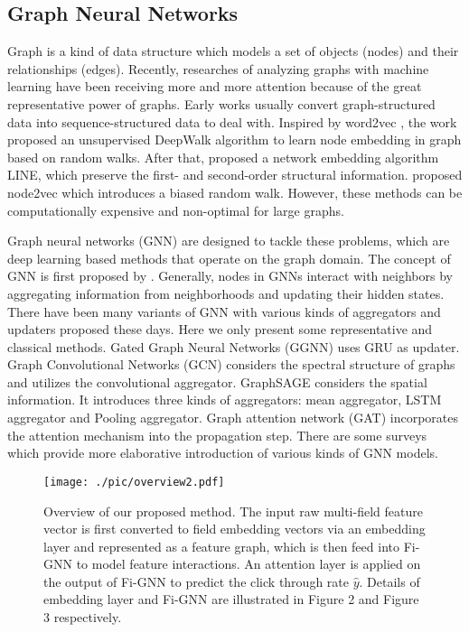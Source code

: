 \documentclass[sigconf]{acmart}
\begin{document}
\subsection{Graph Neural Networks}
Graph is a kind of data structure which models a set of objects (nodes) and their relationships (edges). 
Recently, researches of analyzing graphs with machine learning have been receiving more and more attention because of the great representative power of graphs.
Early works usually convert graph-structured data into sequence-structured data to deal with. 
Inspired by word2vec \cite{mikolov2013distributed},
the work \cite{perozzi2014deepwalk} proposed an unsupervised DeepWalk algorithm to learn node embedding in graph based on random walks. 
After that, \cite{tang2015line} proposed a network embedding algorithm LINE, which preserve the first- and second-order structural information.
\cite{Grover2016node2vec} proposed node2vec which introduces a biased random walk.
However, these methods can be computationally expensive and non-optimal for large graphs. 

Graph neural networks (GNN) are designed to tackle these problems, which are deep learning based methods that operate on the graph domain.
The concept of GNN is first proposed by \cite{scarselli2009graph}.
Generally, nodes in GNNs interact with neighbors by aggregating information from neighborhoods and updating their hidden states.
There have been many variants of GNN with various kinds of aggregators and updaters proposed these days.
Here we only present some representative and classical methods.
Gated Graph Neural Networks (GGNN) \cite{li2015gated} uses GRU \cite{cho2014learning} as updater.
Graph Convolutional Networks (GCN) \cite{kipf2016semi} considers the spectral structure of graphs and utilizes the convolutional aggregator.
GraphSAGE \cite{hamilton2017inductive} considers the spatial information. It introduces three kinds of aggregators:
mean aggregator, LSTM aggregator and Pooling aggregator.
Graph attention network (GAT) \cite{velivckovic2017graph} incorporates the attention mechanism into the propagation step.
There are some surveys \cite{wu2019comprehensive,zhou2018graph} which provide more elaborative introduction of various kinds of GNN models.

\begin{figure}[t]
\centering
\texttt{[image: ./pic/overview2.pdf]}
\caption{
Overview of our proposed method.
The input raw multi-field feature vector is first converted to field embedding vectors via an embedding layer and represented as a feature graph, which is then feed into Fi-GNN to model feature interactions.
An attention layer is applied on the output of Fi-GNN to predict the click through rate $\hat{y}$.
Details of embedding layer and Fi-GNN are illustrated in Figure 2 and Figure 3 respectively.}
\vspace{-4mm}
\label{fig:overview}
\end{figure}
\end{document}
